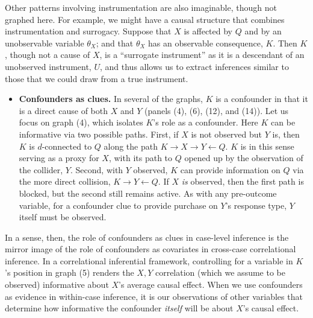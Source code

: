 \documentclass[
  12pt,
]{book}
\providecommand{\tightlist}{%
  \setlength{\itemsep}{0pt}\setlength{\parskip}{0pt}}
\begin{document}
Other patterns involving instrumentation are also imaginable, though not graphed here. For example, we might have a causal structure that combines instrumentation and surrogacy. Suppose that \(X\) is affected by \(Q\) and by an unobservable variable \(\theta_X\); and that \(\theta_X\) has an observable consequence, \(K\). Then \(K\), though not a cause of \(X\), is a ``surrogate instrument'' \citep{hernan2006instruments} as it is a descendant of an unobserved instrument, \(U\), and thus allows us to extract inferences similar to those that we could draw from a true instrument.

\begin{itemize}
\tightlist
\item
  \textbf{Confounders as clues.} In several of the graphs, \(K\) is a confounder in that it is a direct cause of both \(X\) and \(Y\) (panels (4), (6), (12), and (14)). Let us focus on graph (4), which isolates \(K\)'s role as a confounder. Here \(K\) can be informative via two possible paths. First, if \(X\) is not observed but \(Y\) is, then \(K\) is \(d\)-connected to \(Q\) along the path \(K \rightarrow X \rightarrow Y \leftarrow Q\). \(K\) is in this sense serving as a proxy for \(X\), with its path to \(Q\) opened up by the observation of the collider, \(Y\). Second, with \(Y\) observed, \(K\) can provide information on \(Q\) via the more direct collision, \(K \rightarrow Y \leftarrow Q\). If \(X\) \emph{is} observed, then the first path is blocked, but the second still remains active. As with any pre-outcome variable, for a confounder clue to provide purchase on \(Y\)'s response type, \(Y\) itself must be observed.
\end{itemize}

In a sense, then, the role of confounders as clues in case-level inference is the mirror image of the role of confounders as covariates in cross-case correlational inference. In a correlational inferential framework, controlling for a variable in \(K\)'s position in graph (5) renders the \(X, Y\) correlation (which we assume to be observed) informative about \(X\)'s average causal effect. When we use confounders as evidence in within-case inference, it is our observations of other variables that determine how informative the confounder \emph{itself} will be about \(X\)'s causal effect.
\end{document}

